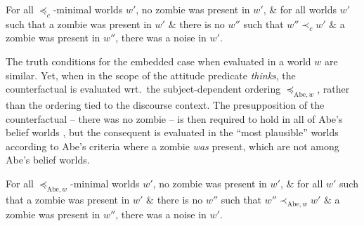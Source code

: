 \documentclass[output=paper]{langscibook}
\begin{document}
\ea \label{sch-has:ex:41}
\ea \label{sch-has:ex:41a} For all $\preceq_{c}$-minimal worlds $w'$, no zombie was present in $w'$, 
\ex \label{sch-has:ex:41b} $\&$ for all worlds $w'$ such that a zombie  was present in $w'$ $\&$ there is no $w''$ such that $w'' \prec_{c} w'$ $\&$ a zombie was present in $w''$, there was a noise in $w'$. \z\z

\noindent The truth conditions for the embedded case  when evaluated in a world $w$ are similar. Yet, when in the scope of the attitude predicate \textit{thinks}, the counterfactual is evaluated wrt.~the subject-dependent ordering $\preceq_{\text{Abe}, w}$, rather than the ordering tied to the discourse context. The presupposition of the counterfactual -- there was no zombie -- is then required to hold in all of Abe's belief worlds , but the consequent is evaluated in the ``most plausible'' worlds according to Abe's criteria where a zombie \textit{was} present, which are not among Abe's belief worlds.\largerpage

\ea \label{sch-has:ex:42}
\ea \label{sch-has:ex:42a} For all $\preceq_{\text{Abe}, w}$-minimal worlds $w'$, no zombie was present in $w'$, 
\ex \label{sch-has:ex:42b} $\&$ for all $w'$ such that a zombie was present in $w'$ $\&$ there is no $w''$ such that $w'' \prec_{\text{Abe}, w} w'$ $\&$ a zombie was present in $w''$, there was a noise in $w'$. \z\z
\end{document}
